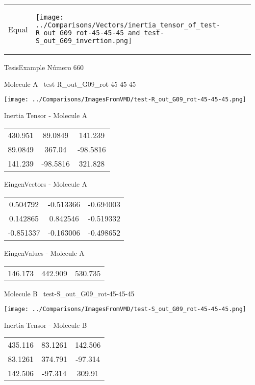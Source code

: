 \vtab[-5mm]
\begin{tabular}{*{2}{m{}}}
\begin{center}
\textcolor{NavyBlue}{\Large Equal}
\end{center}
&
\begin{center}
\texttt{[image: ../Comparisons/Vectors/inertia\_tensor\_of\_test-R\_out\_G09\_rot-45-45-45\_and\_test-S\_out\_G09\_invertion.png]}
\end{center}
\end{tabular}

 \newpage

\vtab[-3cm]
\begin{center}
{\large TesisExample \tab Número 660}
\end{center}
\begin{multicols}{2}
\begin{center}

Molecule A \
test-R\_out\_G09\_rot-45-45-45

\texttt{[image: ../Comparisons/ImagesFromVMD/test-R\_out\_G09\_rot-45-45-45.png]}

Inertia Tensor - Molecule A \\
\begin{tabular}{|c c c|}
430.951	 & 	89.0849	 & 	141.239	 \\
89.0849	 & 	367.04	 & 	-98.5816	 \\
141.239	 & 	-98.5816	 & 	321.828
\end{tabular}

\vtab
 EingenVectors - Molecule A     \\
\begin{tabular}{|c c c|}
0.504792	 & 	-0.513366	 & 	-0.694003	 \\
0.142865	 & 	0.842546	 & 	-0.519332	 \\
-0.851337	 & 	-0.163006	 & 	-0.498652
\end{tabular}

\vtab
 EingenValues - Molecule A     \\
\begin{tabular}{|c c c|}
146.173	 & 	442.909	 & 	530.735	 \\
\end{tabular}
\columnbreak

Molecule B \
test-S\_out\_G09\_rot-45-45-45

\texttt{[image: ../Comparisons/ImagesFromVMD/test-S\_out\_G09\_rot-45-45-45.png]}

Inertia Tensor - Molecule B \\
\begin{tabular}{|c c c|}
435.116	 & 	83.1261	 & 	142.506	 \\
83.1261	 & 	374.791	 & 	-97.314	 \\
142.506	 & 	-97.314	 & 	309.91
\end{tabular}


\end{center}
\end{multicols}
